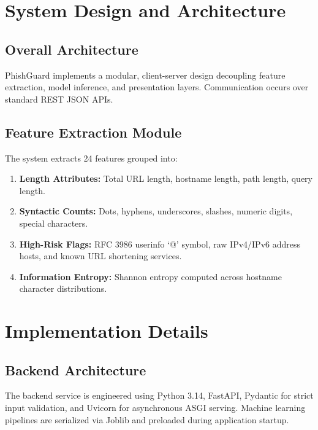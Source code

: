 \documentclass[12pt,a4paper]{report}
\begin{document}
\chapter{System Design and Architecture}
\section{Overall Architecture}
PhishGuard implements a modular, client-server design decoupling feature extraction, model inference, and presentation layers. Communication occurs over standard REST JSON APIs.

\section{Feature Extraction Module}
The system extracts 24 features grouped into:
\begin{enumerate}
    \item \textbf{Length Attributes:} Total URL length, hostname length, path length, query length.
    \item \textbf{Syntactic Counts:} Dots, hyphens, underscores, slashes, numeric digits, special characters.
    \item \textbf{High-Risk Flags:} RFC 3986 userinfo `@' symbol, raw IPv4/IPv6 address hosts, and known URL shortening services.
    \item \textbf{Information Entropy:} Shannon entropy computed across hostname character distributions.
\end{enumerate}

\chapter{Implementation Details}
\section{Backend Architecture}
The backend service is engineered using Python 3.14, FastAPI, Pydantic for strict input validation, and Uvicorn for asynchronous ASGI serving. Machine learning pipelines are serialized via Joblib and preloaded during application startup.
\end{document}
